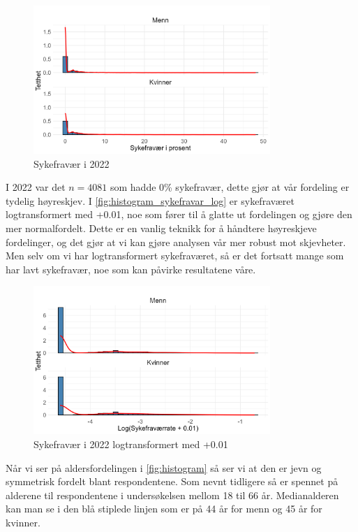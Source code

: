 \documentclass[
  12pt,
  a4paper,
  DIV=11,
  numbers=noendperiod]{scrartcl}
\begin{document}
\begin{figure}[H]
\caption{Sykefravær i 2022}
\label{fig:histogram_sykefravar}
\centering
\includegraphics[width=0.8\textwidth]{dokumentobjekter/figurer/fig_sykefrav.png}
\end{figure}

I 2022 var det \(n=4081\) som hadde 0\% sykefravær, dette gjør at vår
fordeling er tydelig høyreskjev. I
\autoref{fig:histogram_sykefravar_log} er sykefraværet logtransformert
med +0.01, noe som fører til å glatte ut fordelingen og gjøre den mer
normalfordelt. Dette er en vanlig teknikk for å håndtere høyreskjeve
fordelinger, og det gjør at vi kan gjøre analysen vår mer robust mot
skjevheter. Men selv om vi har logtransformert sykefraværet, så er det
fortsatt mange som har lavt sykefravær, noe som kan påvirke resultatene
våre.

\vspace{-0.5cm}
\begin{figure}[H]
\caption{Sykefravær i 2022 logtransformert med +0.01}
\label{fig:histogram_sykefravar_log}
\centering
\includegraphics[width=0.8\textwidth]{dokumentobjekter/figurer/fig_sykefrav_log.png}
\end{figure}

Når vi ser på aldersfordelingen i \autoref{fig:histogram} så ser vi at
den er jevn og symmetrisk fordelt blant respondentene. Som nevnt
tidligere så er spennet på alderene til respondentene i undersøkelsen
mellom 18 til 66 år. Medianalderen kan man se i den blå stiplede linjen
som er på 44 år for menn og 45 år for kvinner.
\end{document}
